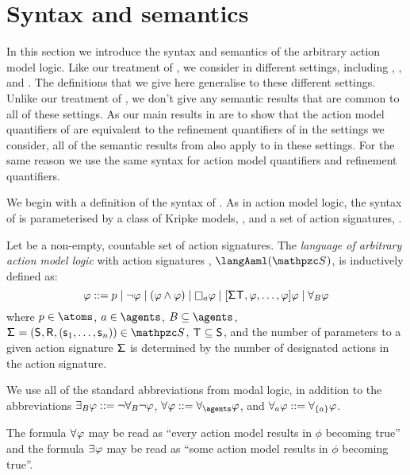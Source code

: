\section{Syntax and semantics}\label{aaml-semantics}

In this section we introduce the syntax and semantics of the arbitrary action model logic.
Like our treatment of \logicRml{}, we consider \logicAaml{} in different settings, including \classK{}, \classKFF{}, and \classS{}.
The definitions that we give here generalise to these different settings.
Unlike our treatment of \logicRml{}, we don't give any semantic results that are common to all of these settings.
As our main results in \logicAaml{} are to show that the action model quantifiers of \logicAaml{} are equivalent to the refinement quantifiers of \logicRml{} in the settings we consider, all of the semantic results from \logicRml{} also apply to \logicAaml{} in these settings.
For the same reason we use the same syntax for action model quantifiers and refinement quantifiers.

We begin with a definition of the syntax of \logicAaml{}.
As in action model logic, the syntax of \logicAaml{} is parameterised by a class of Kripke models, \classC{}, and a set of action signatures, \aSignatureFamily{}.

\begin{definition}
Let \aSignatureFamily{} be a non-empty, countable set of action signatures.
The {\em language of arbitrary action model logic} with action signatures \aSignatureFamily{}, $\langAaml(\aSignatureFamily)$, is inductively defined as:
$$
\phi ::= 
    \atomP \mid
    \lnot \phi \mid
    (\phi \land \phi) \mid
    \necessaryA \phi \mid
    \actionA{\aSignature \aStatesT, \phi, \dots, \phi} \phi \mid
    \allactsBs \phi
$$
where $\atomP \in \atoms$, $\agentA \in \agents$, $\agentsB \subseteq \agents$, $\aSignatureAndTuple \in \aSignatureFamily$, $\aStatesT \subseteq \aStates$, and the number of parameters to a given action signature $\aSignature$ is determined by the number of designated actions in the action signature.
\end{definition}

We use all of the standard abbreviations from modal logic, in addition to the abbreviations $\somerefsBs \phi ::= \lnot \allrefsBs \lnot \phi$, $\allrefs \phi ::= \allrefsAs \phi$, and $\allrefsA \phi ::= \allrefs[\{\agentA\}] \phi$.

The formula $\allacts \phi$ may be read as ``every action model results in $\phi$ becoming true'' and the formula $\someacts \phi$ may be read as ``some action model results in $\phi$ becoming true''.

